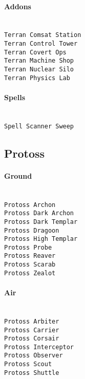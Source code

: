 \paragraph{Addons} \mbox{}\\
\verb|Terran Comsat Station| \\
\verb|Terran Control Tower| \\
\verb|Terran Covert Ops| \\
\verb|Terran Machine Shop| \\
\verb|Terran Nuclear Silo| \\
\verb|Terran Physics Lab|

\paragraph{Spells} \mbox{}\\
\verb|Spell Scanner Sweep|

\subsection{Protoss}

\paragraph{Ground} \mbox{}\\
\verb|Protoss Archon| \\
\verb|Protoss Dark Archon| \\
\verb|Protoss Dark Templar| \\
\verb|Protoss Dragoon| \\
\verb|Protoss High Templar| \\
\verb|Protoss Probe| \\
\verb|Protoss Reaver| \\
\verb|Protoss Scarab| \\
\verb|Protoss Zealot|

\paragraph{Air} \mbox{}\\
\verb|Protoss Arbiter| \\
\verb|Protoss Carrier| \\
\verb|Protoss Corsair| \\
\verb|Protoss Interceptor| \\
\verb|Protoss Observer| \\
\verb|Protoss Scout| \\
\verb|Protoss Shuttle|

